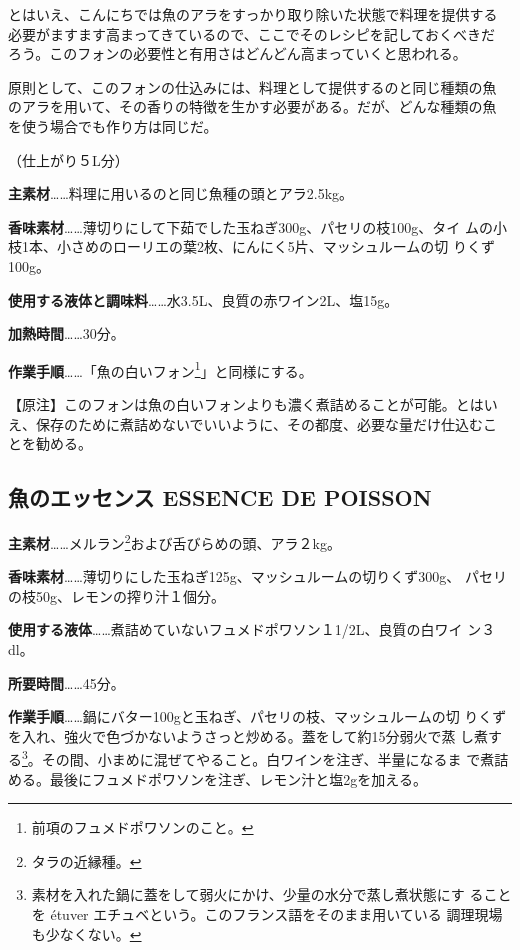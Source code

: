 \documentclass[twoside,12Q,b5paper,tombo]{escoffierltjsbook}
\newenvironment{recette}{\begin{multicols}{2}}{\end{multicols}}
\begin{document}
\begin{recette}
とはいえ、こんにちでは魚のアラをすっかり取り除いた状態で料理を提供する
必要がますます高まってきているので、ここでそのレシピを記しておくべきだ
ろう。このフォンの必要性と有用さはどんどん高まっていくと思われる。

原則として、このフォンの仕込みには、料理として提供するのと同じ種類の魚
のアラを用いて、その香りの特徴を生かす必要がある。だが、どんな種類の魚
を使う場合でも作り方は同じだ。

（仕上がり５L分）

\textbf{主素材}\ldots{}\ldots{}料理に用いるのと同じ魚種の頭とアラ2.5kg。

\textbf{香味素材}\ldots{}\ldots{}薄切りにして下茹でした玉ねぎ300g、パセリの枝100g、タイ
ムの小枝1本、小さめのローリエの葉2枚、にんにく5片、マッシュルームの切
りくず100g。

\textbf{使用する液体と調味料}\ldots{}\ldots{}水3.5L、良質の赤ワイン2L、塩15g。

\textbf{加熱時間}\ldots{}\ldots{}30分。

\textbf{作業手順}\ldots{}\ldots{}「魚の白いフォン\footnote{前項のフュメドポワソンのこと。}」と同様にする。

【原注】このフォンは魚の白いフォンよりも濃く煮詰めることが可能。とはい
え、保存のために煮詰めないでいいように、その都度、必要な量だけ仕込むこ
とを勧める。

\subsection{魚のエッセンス ESSENCE DE
POISSON}\label{ux9b5aux306eux30a8ux30c3ux30bbux30f3ux30b9-essence-de-poisson}

\textbf{主素材}\ldots{}\ldots{}メルラン\footnote{タラの近縁種。}および舌びらめの頭、アラ２kg。

\textbf{香味素材}\ldots{}\ldots{}薄切りにした玉ねぎ125g、マッシュルームの切りくず300g、
パセリの枝50g、レモンの搾り汁１個分。

\textbf{使用する液体}\ldots{}\ldots{}煮詰めていないフュメドポワソン１1/2L、良質の白ワイ
ン３dl。

\textbf{所要時間}\ldots{}\ldots{}45分。

\textbf{作業手順}\ldots{}\ldots{}鍋にバター100gと玉ねぎ、パセリの枝、マッシュルームの切
りくずを入れ、強火で色づかないようさっと炒める。蓋をして約15分弱火で蒸
し煮する\footnote{素材を入れた鍋に蓋をして弱火にかけ、少量の水分で蒸し煮状態にす
  ることを étuver エチュベという。このフランス語をそのまま用いている
  調理現場も少なくない。}。その間、小まめに混ぜてやること。白ワインを注ぎ、半量になるま
で煮詰める。最後にフュメドポワソンを注ぎ、レモン汁と塩2gを加える。


\end{recette}
\end{document}
